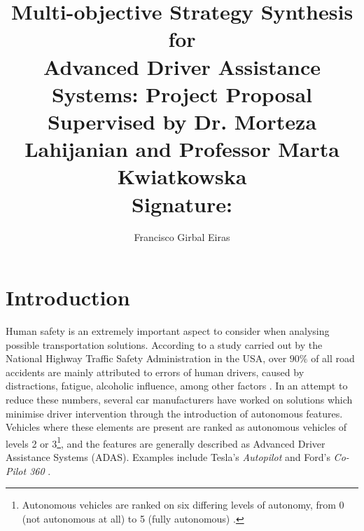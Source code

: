 \documentclass[a4paper]{article}
\begin{document}
\author{Francisco Girbal Eiras}
\title{Multi-objective Strategy Synthesis for \\[-0.35cm] Advanced Driver Assistance Systems: Project Proposal \\[0.5cm] \large Supervised by Dr. Morteza Lahijanian and Professor Marta Kwiatkowska \\[0.5cm] Signature: \hspace{100mm} \vspace{10mm}}
\date{}
\maketitle

\section{Introduction}

Human safety is an extremely important aspect to consider when analysing possible transportation solutions. According to a study carried out by the National Highway Traffic Safety Administration in the USA, over $90\%$ of all road accidents are mainly attributed to errors of human drivers, caused by distractions, fatigue, alcoholic influence, among other factors \cite{crashes}. In an attempt to reduce these numbers, several car manufacturers have worked on solutions which minimise driver intervention through the introduction of autonomous features. Vehicles where these elements are present are ranked as autonomous vehicles of levels 2 or 3\footnote{Autonomous vehicles are ranked on six differing levels of autonomy, from 0 (not autonomous at all) to 5 (fully autonomous) \cite{wired}.}, and the features are generally described as Advanced Driver Assistance Systems (ADAS). Examples include Tesla's \textit{Autopilot} and Ford's \textit{Co-Pilot 360} \cite{autopilot1, ford}.
\end{document}
